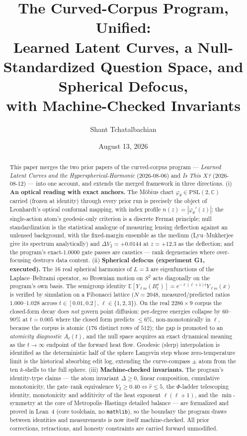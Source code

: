 \documentclass[11pt,a4paper]{article}
\title{The Curved-Corpus Program, Unified:\\
{\large Learned Latent Curves, a Null-Standardized Question Space, and Spherical Defocus,\\ with Machine-Checked Invariants}}
\author{Shant Tchatalbachian}
\date{August 13, 2026}
\theoremstyle{plain}
\theoremstyle{remark}
\begin{document}
\maketitle

\begin{abstract}
This paper merges the two prior papers of the curved-corpus program --- \emph{Learned Latent Curves and the Hyperspherical-Harmonic} (2026-08-06) and \emph{Is This $X$?} (2026-08-12) --- into one account, and extends the merged framework in three directions. (i) \textbf{An optical reading with exact anchors.} The M\"obius chart $\varphi_\theta\in\mathrm{PSL}(2,\mathbb{C})$ carried (frozen at identity) through every prior run is precisely the object of Leonhardt's optical conformal mapping, with index profile $n(z)=|\varphi_\theta'(z)|$; the single-action atom's geodesic-only criterion is a discrete Fermat principle; null standardization is the statistical analogue of measuring lensing deflection against an unlensed background, with the fixed-margin ensemble as the medium (Lyu--Mukherjee give its spectrum analytically) and $\Delta V_2=+0.0144$ at $z=+12.3$ as the deflection; and the program's exact-$1.0000$ gate passes are caustics --- rank degeneracies where over-focusing destroys data content. (ii) \textbf{Spherical defocus (experiment G1, executed).} The 16 real spherical harmonics of $L=3$ are eigenfunctions of the Laplace--Beltrami operator, so Brownian motion on $S^2$ acts diagonally on the program's own basis. The semigroup identity $\mathbb{E}[Y_{\ell m}(B_t^x)]=e^{-\ell(\ell+1)t}Y_{\ell m}(x)$ is verified by simulation on a Fibonacci lattice ($N{=}2048$, measured/predicted ratios $1.000$--$1.028$ across $t\in[0.01,0.2]$, $\ell\in\{1,2,3\}$). On the real $2286\times9$ corpus the closed-form decay does \emph{not} govern point diffusion: per-degree energies collapse by $60$--$90\%$ at $t=0.005$ where the closed form predicts $\le6\%$, non-monotonically in $\ell$, because the corpus is atomic ($176$ distinct rows of $512$); the gap is promoted to an \emph{atomicity diagnostic} $A_\ell(t)$, and the null space acquires an exact dynamical meaning as the $t\to\infty$ endpoint of the forward heat flow. Geodesic (slerp) interpolation is identified as the deterministic half of the sphere Langevin step whose zero-temperature limit is the historical absorbing edit log, extending the curve-compass $\pm$ atom from the ten $k$-shells to the full sphere. (iii) \textbf{Machine-checked invariants.} The program's identity-type claims --- the atom invariant $\Delta\ge0$, linear composition, cumulative monotonicity, the gate--rank equivalence $V_2\ge0.40\iff\hat r\le5$, the $\Phi$-ladder telescoping identity, monotonicity and additivity of the heat exponent $\ell(\ell+1)$, and the $\min$-symmetry at the core of Metropolis--Hastings detailed balance --- are formalized and proved in Lean~4 (core toolchain, no \texttt{mathlib}), so the boundary the program draws between identities and measurements is now itself machine-checked. All prior corrections, retractions, and honesty constraints are carried forward unmodified.
\end{abstract}
\end{document}
